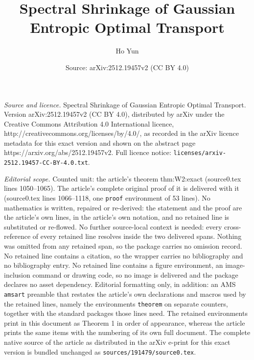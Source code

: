 \documentclass[10pt,a4paper]{amsart}
\title{{\large Spectral Shrinkage of Gaussian Entropic Optimal Transport}}
\author{Ho Yun}
\date{Source: arXiv:2512.19457v2 (CC BY 4.0)}
\begin{document}
\maketitle

\noindent\emph{Source and licence.} {\large Spectral Shrinkage of Gaussian Entropic Optimal Transport}. Version arXiv:2512.19457v2 (CC BY 4.0), distributed by arXiv under the Creative Commons Attribution 4.0 International licence, http://creativecommons.org/licenses/by/4.0/, as recorded in the arXiv licence metadata for this exact version and shown on the abstract page https://arxiv.org/abs/2512.19457v2. Full licence notice: \texttt{licenses/arxiv-2512.19457-CC-BY-4.0.txt}.\par\smallskip

\noindent\textit{Editorial scope.} Counted unit: the article's theorem thm:W2:exact (source0.tex lines 1050--1065). The article's complete original proof of it is delivered with it (source0.tex lines 1066--1118, one \texttt{proof} environment of 53 lines). No mathematics is written, repaired or re-derived: the statement and the proof are the article's own lines, in the article's own notation, and no retained line is substituted or re-flowed.  No further source-local context is needed: every cross-reference of every retained line resolves inside the two delivered spans.  Nothing was omitted from any retained span, so the package carries no omission record.  No retained line contains a citation, so the wrapper carries no bibliography and no bibliography entry.  No retained line contains a figure environment, an image-inclusion command or drawing code, so no image is delivered and the package declares no asset dependency.  Editorial formatting only, in addition: an AMS \texttt{amsart} preamble that restates the article's own declarations and macros used by the retained lines, namely the environments \texttt{theorem} on separate counters, together with the standard packages those lines need.  The retained environments print in this document as Theorem 1 in order of appearance, whereas the article prints the same items with the numbering of its own full document.  The complete native source of the article as distributed in the arXiv e-print for this exact version is bundled unchanged as \texttt{sources/191479/source0.tex}.
\end{document}
